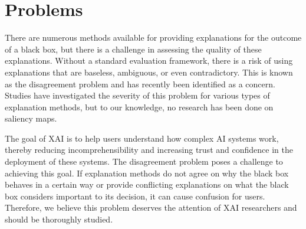 \section{Problems}
\label{sec:problem} 
There are numerous methods available for providing explanations for the outcome of a black box, but there is a challenge in assessing the quality of these explanations. Without a standard evaluation framework, there is a risk of using explanations that are baseless, ambiguous, or even contradictory. This is known as the disagreement problem and has recently been identified as a concern. Studies have investigated the severity of this problem for various types of explanation methods, but to our knowledge, no research has been done on saliency maps.

The goal of XAI is to help users understand how complex AI systems work, thereby reducing incomprehensibility and increasing trust and confidence in the deployment of these systems. The disagreement problem poses a challenge to achieving this goal. If explanation methods do not agree on why the black box behaves in a certain way or provide conflicting explanations on what the black box considers important to its decision, it can cause confusion for users. Therefore, we believe this problem deserves the attention of XAI researchers and should be thoroughly studied.

